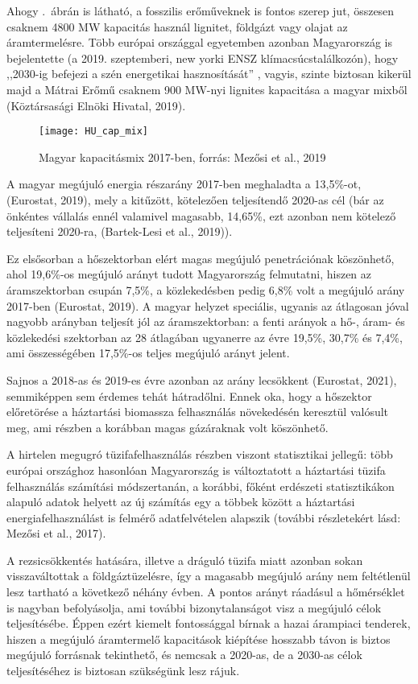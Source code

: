 \documentclass[twoside, magyar, showtrims]{corvinusphd}
\theoremstyle{plain}
\theoremstyle{remark}
\theoremstyle{definition}
\begin{document}
Ahogy .~ábrán is látható, 
a fosszilis erőműveknek is fontos szerep jut, 
összesen csaknem 4800 MW kapacitás használ
lignitet, földgázt vagy olajat az áramtermelésre.
Több európai országgal egyetemben azonban
Magyarország is bejelentette (a 2019. szeptemberi, new yorki
ENSZ klímacsúcstalálkozón), hogy ,,2030-ig befejezi
a szén energetikai hasznosítását'' , vagyis, szinte biztosan
kikerül majd a Mátrai Erőmű csaknem 900 MW-nyi lignites kapacitása
a magyar mixből (Köztársasági Elnöki Hivatal, 2019).

\begin{figure}
    \centering
    \texttt{[image: HU\_cap\_mix]}
    \caption{Magyar kapacitásmix 2017-ben, forrás: Mezősi et al., 2019}
    \label{fig:HU_cap_mix}
\end{figure}

A magyar megújuló energia részarány 2017-ben meghaladta a 13,5\%-ot,
(Eurostat, 2019), mely a kitűzött, kötelezően teljesítendő 2020-as cél
(bár az önkéntes vállalás ennél valamivel magasabb, 14,65\%, ezt
azonban nem kötelező teljesíteni 2020-ra, (Bartek-Lesi et al., 2019)).

Ez elsősorban a hőszektorban 
elért magas megújuló penetrációnak köszönhető, ahol 19,6\%-os
megújuló arányt tudott Magyarország felmutatni, hiszen az
áramszektorban csupán 7,5\%, a közlekedésben pedig 6,8\% volt
a megújuló arány 2017-ben (Eurostat, 2019). 
A magyar helyzet speciális, ugyanis az  átlagosan jóval nagyobb arányban
teljesít jól az áramszektorban: a fenti arányok a hő-, áram- 
és közlekedési szektorban az 28 átlagában 
ugyanerre az évre 19,5\%,
30,7\% és 7,4\%, ami összességében 17,5\%-os teljes
megújuló arányt jelent.

Sajnos a 2018-as és 2019-es évre azonban az arány lecsökkent
(Eurostat, 2021), semmiképpen sem érdemes tehát hátradőlni.
Ennek oka, hogy a hőszektor előretörése a háztartási biomassza
felhasználás növekedésén keresztül valósult meg,
ami részben a korábban magas gázáraknak volt köszönhető.

A hirtelen megugró tüzifafelhasználás részben viszont
statisztikai jellegű: több európai országhoz hasonlóan
Magyarország is változtatott a háztartási tüzifa felhasználás
számítási módszertanán, a korábbi, főként erdészeti statisztikákon
alapuló adatok helyett az új számítás egy a többek között a háztartási
energiafelhasználást is felmérő adatfelvételen alapszik 
(további részletekért lásd: Mezősi et al., 2017).

A rezsicsökkentés hatására, illetve a dráguló tüzifa miatt
azonban sokan visszaváltottak a földgáztüzelésre, így a magasabb 
megújuló arány nem feltétlenül lesz tartható a következő néhány évben.
A pontos arányt ráadásul a hőmérséklet is nagyban befolyásolja, 
ami további bizonytalanságot visz a megújuló célok teljesítésébe.
Éppen ezért kiemelt fontossággal bírnak a hazai
árampiaci tenderek, hiszen a megújuló áramtermelő
kapacitások kiépítése hosszabb távon is biztos megújuló forrásnak
tekinthető, és nemcsak a 2020-as, de a 2030-as célok
teljesítéséhez is biztosan szükségünk lesz rájuk.
\end{document}
